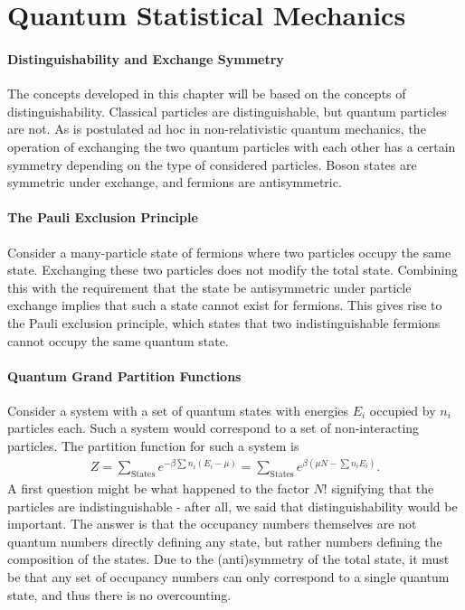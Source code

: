 \section{Quantum Statistical Mechanics}

\paragraph{Distinguishability and Exchange Symmetry}
The concepts developed in this chapter will be based on the concepts of distinguishability. Classical particles are distinguishable, but quantum particles are not. As is postulated ad hoc in non-relativistic quantum mechanics, the operation of exchanging the two quantum particles with each other has a certain symmetry depending on the type of considered particles. Boson states are symmetric under exchange, and fermions are antisymmetric.

\paragraph{The Pauli Exclusion Principle}
Consider a many-particle state of fermions where two particles occupy the same state. Exchanging these two particles does not modify the total state. Combining this with the requirement that the state be antisymmetric under particle exchange implies that such a state cannot exist for fermions. This gives rise to the Pauli exclusion principle, which states that two indistinguishable fermions cannot occupy the same quantum state.

\paragraph{Quantum Grand Partition Functions}
Consider a system with a set of quantum states with energies $E_{i}$ occupied by $n_{i}$ particles each. Such a system would correspond to a set of non-interacting particles. The partition function for such a system is
\begin{align*}
	Z = \sum\limits_{\text{States}}e^{-\beta\sum n_{i}(E_{i} - \mu)} = \sum\limits_{\text{States}}e^{\beta\left(\mu N - \sum n_{i}E_{i}\right)}.
\end{align*}
A first question might be what happened to the factor $N!$ signifying that the particles are indistinguishable - after all, we said that distinguishability would be important. The answer is that the occupancy numbers themselves are not quantum numbers directly defining any state, but rather numbers defining the composition of the states. Due to the (anti)symmetry of the total state, it must be that any set of occupancy numbers can only correspond to a single quantum state, and thus there is no overcounting.


